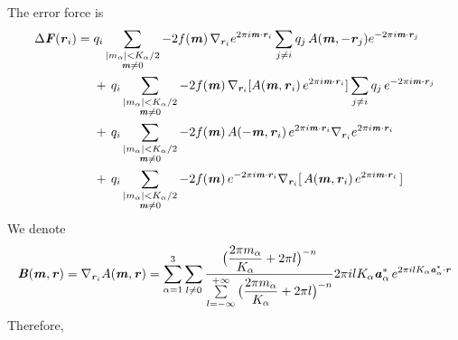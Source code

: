 \documentclass[aps,pre,preprint]{revtex4}
\renewcommand{\v}[1]{\textbf{\textit{#1}}}
\begin{document}
The error force is 
\begin{align}\nonumber
  \Delta\v F(\v r_i)
  =\;&
  q_i
  \sum_{
    \begin{subarray}{c}
      \vert m_{\alpha}\vert < K_\alpha/2\\
      \v m\neq 0
    \end{subarray}}
  -2f(\v m)\,
  \nabla_{\v r_i}
  e^{2\pi i\v m\cdot \v r_i}
  \sum_{j\neq i}q_j\,
  A(\v m, -\v r_j)
  e^{-2\pi i\v m\cdot\v r_j} \\\nonumber
  & +\,
  q_i
  \sum_{
    \begin{subarray}{c}
      \vert m_{\alpha}\vert < K_\alpha/2\\
      \v m\neq 0
    \end{subarray}}
  -2f(\v m)\,
  \nabla_{\v r_i}
  [A(\v m, \v r_i)\,
  e^{2\pi i\v m\cdot \v r_i} ]
  \sum_{j\neq i}q_j\,
  e^{-2\pi i\v m\cdot\v r_j} \\\nonumber
  & +\,
  q_i
  \sum_{
    \begin{subarray}{c}
      \vert m_{\alpha}\vert < K_\alpha/2\\
      \v m\neq 0
    \end{subarray}}
  -2f(\v m)\,
  A(-\v m, \v r_i)\,e^{2\pi i\v m\cdot \v r_i} \nabla_{\v r_i}e^{2\pi i\v m\cdot\v r_i} \\
  & +\,
  q_i
  \sum_{
    \begin{subarray}{c}
      \vert m_{\alpha}\vert < K_\alpha/2\\
      \v m\neq 0
    \end{subarray}}
  -2f(\v m)\,
  e^{-2\pi i\v m\cdot \v r_i}
  \nabla_{\v r_i} [\,A(\v m, \v r_i) \,e^{2\pi i\v m\cdot\v r_i}\,] 
\end{align}
We denote
\begin{align}
  \v B(\v m, \v r) = \nabla_{\v r_i}A(\v m, \v r)
  =
  \sum_{\alpha=1}^3\sum_{l\neq 0}
  \frac
  {\big(\dfrac{2\pi m_\alpha}{K_\alpha} + 2\pi l\big)^{-n}}
  {\sum\limits_{l=-\infty}^{+\infty}
    \big(\dfrac{2\pi m_\alpha}{K_\alpha} + 2\pi l\big)^{-n}}
  2\pi i l K_\alpha\v a_\alpha^\ast\,e^{2\pi i l K_\alpha\v a^\ast_\alpha\cdot \v r} 
\end{align}
Therefore,
\end{document}
